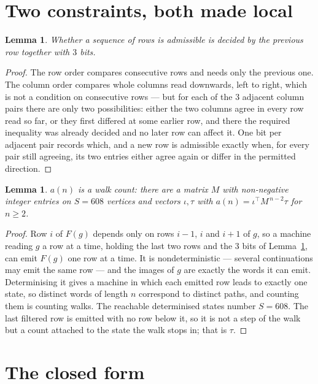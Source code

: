 \documentclass[11pt,a4paper]{article}
\theoremstyle{plain}
\newtheorem{lemma}[theorem]{Lemma}
\theoremstyle{definition}
\begin{document}
\section{Two constraints, both made local}

\begin{lemma}\label{lem:local}
Whether a sequence of rows is admissible is decided by the previous row together with
$3$ bits.
\end{lemma}

\begin{proof}
The row order compares consecutive rows and needs only the previous one. The column order
compares whole columns read downwards, left to right, which is not a condition on consecutive
rows --- but for each of the $3$ adjacent column pairs there are only two possibilities:
either the two columns agree in every row read so far, or they first differed at some earlier
row, and there the required inequality was already decided and no later row can affect it. One
bit per adjacent pair records which, and a new row is admissible exactly when, for every pair
still agreeing, its two entries either agree again or differ in the permitted direction.
\end{proof}

\begin{lemma}\label{lem:det}
$a(n)$ is a walk count: there are a matrix $M$ with non-negative integer entries on $S=608$
vertices and vectors $\iota,\tau$ with $a(n)=\iota^{\!\top}M^{\,n-2}\tau$ for $n\ge2$.
\end{lemma}

\begin{proof}
Row $i$ of $F(g)$ depends only on rows $i-1$, $i$ and $i+1$ of $g$, so a machine reading $g$ a
row at a time, holding the last two rows and the $3$ bits of Lemma~\ref{lem:local}, can
emit $F(g)$ one row at a time. It is nondeterministic --- several continuations may emit the
same row --- and the images of $g$ are exactly the words it can emit. Determinising it gives a
machine in which each emitted row leads to exactly one state, so distinct words of length $n$
correspond to distinct paths, and counting them is counting walks. The reachable determinised
states number $S=608$. The last filtered row is emitted with no row below it, so it is not a
step of the walk but a count attached to the state the walk stops in; that is $\tau$.
\end{proof}

\section{The closed form}
\end{document}

